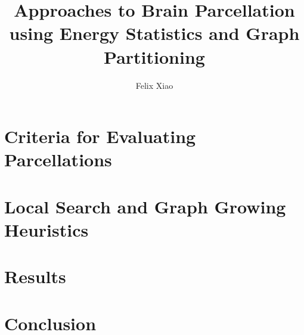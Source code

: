 \documentclass[12pt,lot,lof]{puthesis_undergraduate}
\title{Approaches to Brain Parcellation using Energy Statistics and Graph Partitioning}
\author{Felix Xiao}
\begin{document}
\maketitle
\tableofcontents

%

%

\chapter{Criteria for Evaluating Parcellations}


\chapter{Local Search and Graph Growing Heuristics}


%

%

%

\chapter{Results}

\chapter{Conclusion}



\end{document}
